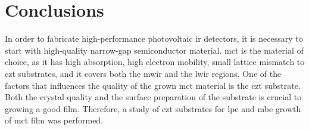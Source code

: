 \chapter{Conclusions}\label{ch:conclusion}

In order to fabricate high-performance photovoltaic \ac{ir} detectors, it is necessary to start with high-quality narrow-gap semiconductor material. \Ac{mct} is the material of choice, as it has high absorption, high electron mobility, small lattice mismatch to \ac{czt} substrates, and it covers both the \ac{mwir} and the \ac{lwir} regions. One of the factors that influences the quality of the grown \ac{mct} material is the \ac{czt} substrate. Both the crystal quality and the surface preparation of the substrate is crucial to growing a good film. Therefore, a study of \ac{czt} substrates for \ac{lpe} and \ac{mbe} growth of \ac{mct} film was performed. %

